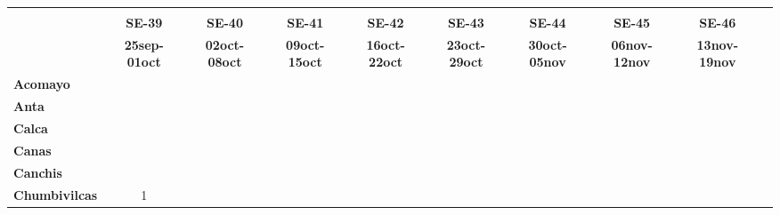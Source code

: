 \begin{tabular}{lccccccccc}
	\textbf{}              	  
	& \multicolumn{1}{l}{}                        
	& \multicolumn{1}{l}{}      
	& \multicolumn{1}{l}{}                         
	& \multicolumn{1}{l}{}                         
	& \multicolumn{1}{l}{}                         
	& \multicolumn{1}{l}{}                        
	& \multicolumn{1}{l}{}                         
	& \multicolumn{1}{l}{} \\                   
	\textbf{}  															
	&\textbf{SE-39}
	&\textbf{SE-40}
	&\textbf{SE-41}
	&\textbf{SE-42}
	&\textbf{SE-43}	
	&\textbf{SE-44}	
	&\textbf{SE-45}
	&\textbf{SE-46} \\							
	\textbf{}      							
	&\textbf{25sep-01oct} 
	&\textbf{02oct-08oct}
	&\textbf{09oct-15oct}
	&\textbf{16oct-22oct}
	&\textbf{23oct-29oct}
	&\textbf{30oct-05nov}
	&\textbf{06nov-12nov}
	&\textbf{13nov-19nov}\\
	\textbf{Acomayo}                        												
	&\cellcolor[HTML]{FCC46C}
	&\cellcolor[HTML]{FCC46C}					
	&\cellcolor[HTML]{FCC46C}
	&\cellcolor[HTML]{FCC46C}					
	&\cellcolor[HTML]{FCC46C}
	&\cellcolor[HTML]{FCC46C} 
	&\cellcolor[HTML]{FCC46C}
	&\cellcolor[HTML]{FCC46C}\\
	\textbf{Anta}                                                  							&\cellcolor[HTML]{FCC46C}						
	&\cellcolor[HTML]{FCC46C}					
	&\cellcolor[HTML]{FCC46C}					
	&\cellcolor[HTML]{FCC46C}					
	&\cellcolor[HTML]{FCC46C}
	&\cellcolor[HTML]{FCC46C}	
	&\cellcolor[HTML]{FCC46C}
	&\cellcolor[HTML]{FCC46C}\\					
	\textbf{Calca} 
	&\cellcolor[HTML]{FCC46C}											
	&\cellcolor[HTML]{FCC46C}
	&\cellcolor[HTML]{FCC46C}
	&\cellcolor[HTML]{FCC46C}
	&\cellcolor[HTML]{FCC46C}
	&\cellcolor[HTML]{FCC46C}
	&\cellcolor[HTML]{FCC46C}
	&\cellcolor[HTML]{FCC46C}\\          			
	\textbf{Canas}     			
	&\cellcolor[HTML]{FCC46C}					
	&\cellcolor[HTML]{FCC46C}
	&\cellcolor[HTML]{FCC46C}	
	&\cellcolor[HTML]{FCC46C}
	&\cellcolor[HTML]{FCC46C}
	&\cellcolor[HTML]{FCC46C}
	&\cellcolor[HTML]{FCC46C}
	&\cellcolor[HTML]{FCC46C}\\	
	\textbf{Canchis}   							
	&\cellcolor[HTML]{FCC46C}
	&\cellcolor[HTML]{FCC46C}
	&\cellcolor[HTML]{FCC46C}
	&\cellcolor[HTML]{FCC46C}
	&\cellcolor[HTML]{FCC46C}
	&\cellcolor[HTML]{FCC46C}
	&\cellcolor[HTML]{FCC46C}
	&\cellcolor[HTML]{FCC46C}\\											
	\textbf{Chumbivilcas}                      												
	&1
	&\cellcolor[HTML]{FCC46C}

\end{tabular}
